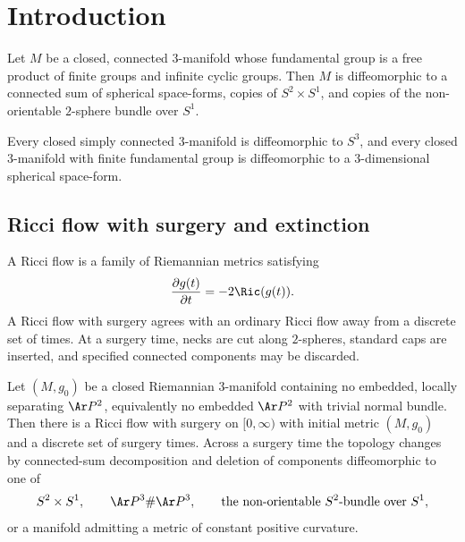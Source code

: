 \chapter*{Introduction}
\label{chap:introduction}

\begin{theorem}
\label{thm:classification-fundamental-group-free-product}
\label{Theorem1}
Let $M$ be a closed, connected $3$-manifold whose fundamental group is a
free product of finite groups and infinite cyclic groups. Then $M$ is
diffeomorphic to a connected sum of spherical space-forms, copies of
$S^2\times S^1$, and copies of the non-orientable $2$-sphere bundle over
$S^1$.
\end{theorem}

\begin{corollary}
\label{cor:poincare-and-spherical-space-form}
Every closed simply connected $3$-manifold is diffeomorphic to $S^3$, and
every closed $3$-manifold with finite fundamental group is diffeomorphic to a
$3$-dimensional spherical space-form.
\end{corollary}

\section{Ricci flow with surgery and extinction}

A Ricci flow is a family of Riemannian metrics satisfying
\[
  \frac{\partial g(t)}{\partial t}=-2\Ric(g(t)).
\]
A Ricci flow with surgery agrees with an ordinary Ricci flow away from a
discrete set of times. At a surgery time, necks are cut along $2$-spheres,
standard caps are inserted, and specified connected components may be
discarded.

\begin{theorem}
\label{thm:ricci-flow-surgery-existence}
\label{surgery}
Let $(M,g_0)$ be a closed Riemannian $3$-manifold containing no embedded,
locally separating $\Ar P^2$, equivalently no embedded $\Ar P^2$ with trivial
normal bundle. Then there is a Ricci flow with surgery on $[0,\infty)$ with
initial metric $(M,g_0)$ and a discrete set of surgery times. Across a surgery
time the topology changes by connected-sum decomposition and deletion of
components diffeomorphic to one of
\[
  S^2\times S^1,\qquad \Ar P^3\#\Ar P^3,\qquad
  \text{the non-orientable $S^2$-bundle over $S^1$},
\]
or a manifold admitting a metric of constant positive curvature.
\end{theorem}

